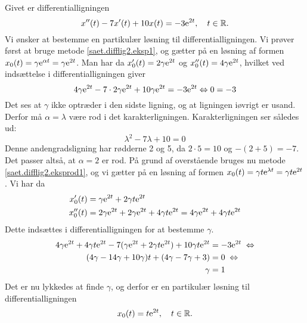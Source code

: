 \begin{example} \label{eks.difflig2.eksprod1}
Givet er differentialligningen
\begin{equation}
x''(t) -7x'(t) + 10x(t) = -3\mathrm{e}^{2t}, \quad t \in \mathbb{R}.
\end{equation}
Vi ønsker at bestemme en partikulær løsning til differentialligningen. Vi prøver først at bruge metode \ref{saet.difflig2.eksp1}, og gætter på en løsning af formen $ x_0(t) = \gamma \mathrm{e}^{\alpha t} = \gamma \mathrm{e}^{2t} $. Man har da $ x_0'(t) = 2\gamma \mathrm{e}^{2t} $ og $ x_0''(t) = 4\gamma \mathrm{e}^{2t} $, hvilket ved indsættelse i differentialligningen giver
\begin{equation}
4\gamma \mathrm{e}^{2t} -7 \cdot 2\gamma \mathrm{e}^{2t} + 10\gamma \mathrm{e}^{2t} = -3\mathrm{e}^{2t} \Leftrightarrow 0 = -3
\end{equation}
Det ses at $ \gamma $ ikke optræder i den sidste ligning, og at ligningen iøvrigt er usand. Derfor må $ \alpha = \lambda $ være rod i det karakterligningen. Karakterligningen ser således ud:
\begin{equation}
\lambda^2 - 7\lambda + 10 = 0
\end{equation}  
Denne andengradsligning har rødderne 2 og 5, da $ 2 \cdot 5 = 10 $ og $ -(2+5) = -7 $. Det passer altså, at $ \alpha = 2 $ er rod. \bs
På grund af overstående bruges nu metode \ref{saet.difflig2.eksprod1}, og vi gætter på en løsning af formen $ x_0(t) = \gamma t \mathrm{e}^{\lambda t} = \gamma t \mathrm{e}^{2 t} $. Vi har da
\begin{equation}
\begin{aligned}
x_0'(t) &= \gamma \mathrm{e}^{2 t} + 2 \gamma t \mathrm{e}^{2 t} \\
x_0''(t) &= 2 \gamma \mathrm{e}^{2 t} + 2 \gamma \mathrm{e}^{2 t} + 4 \gamma t \mathrm{e}^{2 t} = 4 \gamma \mathrm{e}^{2 t} + 4 \gamma t \mathrm{e}^{2 t}
\end{aligned}
\end{equation}
Dette indsættes i differentialligningen for at bestemme $ \gamma $.
\begin{equation}
\begin{aligned}
4 \gamma \mathrm{e}^{2 t} + 4 \gamma t \mathrm{e}^{2 t} -7(\gamma \mathrm{e}^{2 t} + 2 \gamma t \mathrm{e}^{2 t}) + 10\gamma t \mathrm{e}^{2 t} &= -3\mathrm{e}^{2t} \; \Leftrightarrow \\
(4 \gamma - 14 \gamma + 10 \gamma)t + (4 \gamma -7 \gamma + 3) &= 0 \; \Leftrightarrow \\
\gamma &= 1
\end{aligned}
\end{equation}
Det er nu lykkedes at finde $ \gamma $, og derfor er en partikulær løsning til differentialligningen
\begin{equation}
x_0(t) = t \mathrm{e}^{2 t}, \quad t \in \mathbb{R}.
\end{equation}
\end{example}

